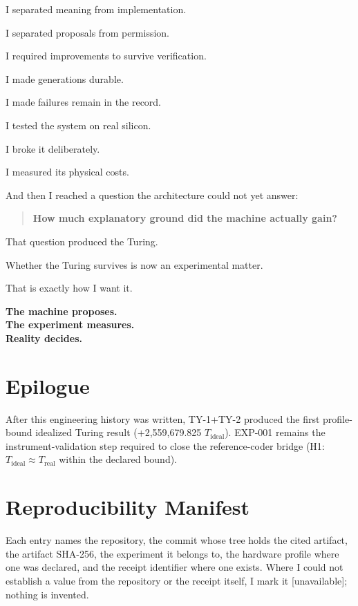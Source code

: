\documentclass[11pt]{article}
\begin{document}
I separated meaning from implementation.

I separated proposals from permission.

I required improvements to survive verification.

I made generations durable.

I made failures remain in the record.

I tested the system on real silicon.

I broke it deliberately.

I measured its physical costs.

And then I reached a question the architecture could not yet answer:

\begin{quote}
\textbf{How much explanatory ground did the machine actually gain?}
\end{quote}

That question produced the Turing.

Whether the Turing survives is now an experimental matter.

That is exactly how I want it.

\begin{center}
\textbf{The machine proposes.}\\
\textbf{The experiment measures.}\\
\textbf{Reality decides.}
\end{center}

\section{Epilogue}

After this engineering history was written, TY-1+TY-2 produced the first profile-bound idealized Turing result (+2,559,679.825 \(T_{\mathrm{ideal}}\)). EXP-001 remains the instrument-validation step required to close the reference-coder bridge (H1: \(T_{\mathrm{ideal}} \approx T_{\mathrm{real}}\) within the declared bound).

\section*{Reproducibility Manifest}

Each entry names the repository, the commit whose tree holds the cited artifact, the artifact SHA-256, the experiment it belongs to, the hardware profile where one was declared, and the receipt identifier where one exists. Where I could not establish a value from the repository or the receipt itself, I mark it [unavailable]; nothing is invented.
\end{document}
